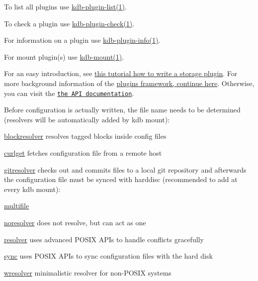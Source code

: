 \begin{DoxyItemize}
\item To list all plugins use \hyperlink{doc_help_kdb-plugin-list_md}{kdb-\/plugin-\/list(1)}.
\item To check a plugin use \hyperlink{doc_help_kdb-plugin-check_md}{kdb-\/plugin-\/check(1)}.
\item For information on a plugin use \hyperlink{doc_help_kdb-plugin-info_md}{kdb-\/plugin-\/info(1)}.
\item For mount plugin(s) use \hyperlink{doc_help_kdb-mount_md}{kdb-\/mount(1)}.
\end{DoxyItemize}

For an easy introduction, see \hyperlink{doc_tutorials_plugins_md}{this tutorial how to write a storage plugin}. For more background information of the \hyperlink{doc_dev_plugins-framework_md}{plugins framework, continue here}. Otherwise, you can visit the \href{https://doc.libelektra.org/api/current/html/group__plugin.html}{\tt the A\+PI documentation}.

Before configuration is actually written, the file name needs to be determined (resolvers will be automatically added by kdb mount)\+:


\begin{DoxyItemize}
\item \hyperlink{autotoc_md65_src_plugins_blockresolver_README_md}{blockresolver} resolves tagged blocks inside config files
\item \hyperlink{autotoc_md141_src_plugins_curlget_README_md}{curlget} fetches configuration file from a remote host
\item \hyperlink{autotoc_md234_src_plugins_gitresolver_README_md}{gitresolver} checks out and commits files to a local git repository and afterwards the configuration file must be synced with harddisc (recommended to add at every kdb mount)\+:
\item \hyperlink{autotoc_md481_src_plugins_multifile_README_md}{multifile}
\item \hyperlink{autotoc_md512_src_plugins_noresolver_README_md}{noresolver} does not resolve, but can act as one
\item \hyperlink{autotoc_md619_src_plugins_resolver_README_md}{resolver} uses advanced P\+O\+S\+IX A\+P\+Is to handle conflicts gracefully
\item \hyperlink{autotoc_md664_src_plugins_sync_README_md}{sync} uses P\+O\+S\+IX A\+P\+Is to sync configuration files with the hard disk
\item \hyperlink{autotoc_md823_src_plugins_wresolver_README_md}{wresolver} minimalistic resolver for non-\/\+P\+O\+S\+IX systems
\end{DoxyItemize}

